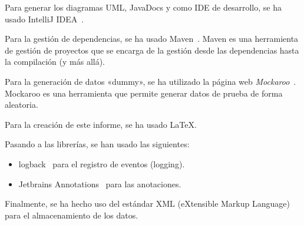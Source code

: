 Para generar los diagramas UML, JavaDocs y como IDE de desarrollo, se ha usado IntelliJ IDEA~\autocite{jetbrains.idea}.

Para la gestión de dependencias, se ha usado Maven~\autocite{maven}.
Maven es una herramienta de gestión de proyectos que se encarga de la gestión desde las dependencias hasta la compilación (y más allá).

Para la generación de datos «dummy», se ha utilizado la página web \textit{Mockaroo}~\autocite{mockaroo}.
Mockaroo es una herramienta que permite generar datos de prueba de forma aleatoria.

Para la creación de este informe, se ha usado \LaTeX{}.

Pasando a las librerías, se han usado las siguientes:
\begin{itemize}
    \item logback~\autocite{logback} para el registro de eventos (logging).
    \item Jetbrains Annotations~\autocite{jetbrains.annotations} para las anotaciones.
\end{itemize}

Finalmente, se ha hecho uso del estándar XML (eXtensible Markup Language) para el almacenamiento de los datos.

\newpage
